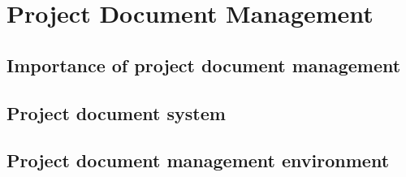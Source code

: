 \chapter{Project Document Management}

\section{Importance of project document management}

\section{Project document system}

\section{Project document management environment}